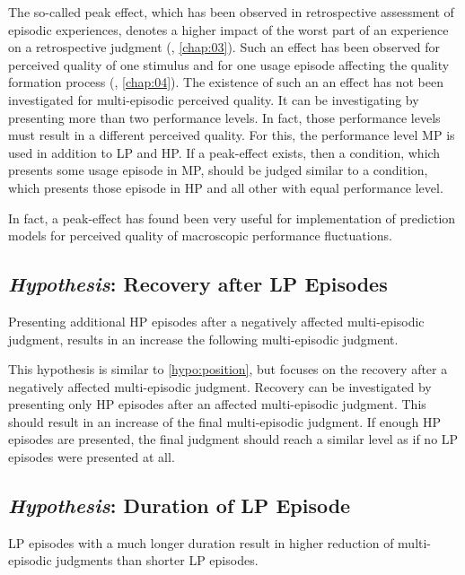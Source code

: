 The so-called peak effect, which has been observed in retrospective assessment of episodic experiences, denotes a higher impact of the worst part of an experience on a retrospective judgment (\cf, \autoref{chap:03}).
Such an effect has been observed for perceived quality of one stimulus and for one usage episode affecting the quality formation process (\cf, \autoref{chap:04}).
The existence of such an an effect has not been investigated for multi-episodic perceived quality.
It can be investigating by presenting more than two performance levels.
In fact, those performance levels must result in a different perceived quality.
For this, the performance level \ac{MP} is used in addition to \ac{LP} and \ac{HP}.
If a peak-effect exists, then a condition, which presents some usage episode in \ac{MP}, should be judged similar to a condition, which presents those episode in \ac{HP} and all other with equal performance level.

In fact, a peak-effect has found been very useful for implementation of prediction models for perceived quality of macroscopic performance fluctuations.

\subsection{\emph{Hypothesis}: Recovery after \acs{LP} Episodes}
\begin{hypothesis}\label{hypo:recovery}
Presenting additional \ac{HP} episodes after a negatively affected multi-episodic judgment, results in an increase the following multi-episodic judgment.
\end{hypothesis}

This hypothesis is similar to \autoref{hypo:position}, but focuses on the recovery after a negatively affected multi-episodic judgment.
Recovery can be investigated by presenting only \ac{HP} episodes after an affected multi-episodic judgment.
This should result in an increase of the final multi-episodic judgment.
If enough \ac{HP} episodes are presented, the final judgment should reach a similar level as if no \ac{LP} episodes were presented at all.

\subsection{\emph{Hypothesis}: Duration of \acs{LP} Episode}
\begin{hypothesis}\label{hypo:duration}
\ac{LP} episodes with a much longer duration result in higher reduction of multi-episodic judgments than shorter \ac{LP} episodes.
\end{hypothesis}

